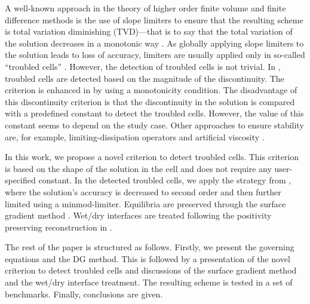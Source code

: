 A well-known approach in the theory of higher order finite volume and
finite difference methods is the use of slope limiters to ensure that
the resulting scheme is total variation diminishing (TVD)---that is to
say that the total variation of the solution decreases in a monotonic
way \cite{leveque2}.  As globally applying slope limiters to the
solution leads to loss of accuracy, limiters are usually applied only
in so-called ``troubled cells'' \cite{krivodonova2004, shu2005}.
However, the detection of troubled cells is not trivial.  In
\cite{Ambati2007452, krivodonova2004}, troubled cells are detected
based on the magnitude of the discontinuity. The criterion is enhanced
in \cite{kesserwani2015} by using a monotonicity condition.  The
disadvantage of this discontinuity criterion is that the discontinuity
in the solution is compared with a predefined constant to detect the
troubled cells. However, the value of this constant seems to depend on
the study case.  Other approaches to ensure stability are, for
example, limiting-dissipation operators \cite{JAFFRE1995,
  Ambati2007452} and artificial viscosity \cite{cesenek2013,
  bublik2011, Bublik2015329}.

In this work, we propose a novel criterion to detect troubled cells.
This criterion is based on the shape of the solution in the cell and
does not require any user-specified constant.  In the detected
troubled cells, we apply the strategy from \cite{Cockburn1989b}, where
the solution's accuracy is decreased to second order and then further
limited using a minmod-limiter.  Equilibria are preserved through the
surface gradient method \cite{zhou}.  Wet/dry interfaces are treated
following the positivity preserving reconstruction in \cite{kurg2}.

The rest of the paper is structured as follows.  Firstly, we present
the governing equations and the DG method.  This is followed by a
presentation of the novel criterion to detect troubled cells and
discussions of the surface gradient method and the wet/dry interface
treatment.  The resulting scheme is tested in a set of benchmarks.
Finally, conclusions are given.
